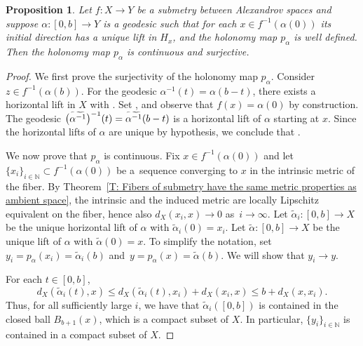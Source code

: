 \documentclass[pdftex]{sigma}
\numberwithin{equation}{section}
\newtheorem{prop}[thm]{Proposition}
\theoremstyle{definition}
\newcommand{\N}{\mathbb{N}} %
\begin{document}
\begin{prop}\label{L: holonomy maps are surjective and continuous}
Let $f\colon X\to Y$ be a submetry between Alexandrov spaces and
suppose $\alpha\colon [0,b]\to Y$ is a geodesic such that for each $x\in f^{-1}(\alpha(0))$ its initial direction has a unique lift in $H_x$, and the holonomy map $p_\alpha$ is well defined. Then the holonomy map $p_\alpha$ is continuous and surjective.
\end{prop}



\begin{proof}

We first prove the surjectivity of the holonomy map $p_\alpha$. Consider $z\in f^{-1}(\alpha(b))$. For the geodesic $\alpha^{-1}(t)= \alpha(b-t)$, there exists a horizontal lift  in $X$ with . Set , and observe that $f(x) = \alpha(0)$ by construction. The geodesic $\smash{\bigl(\widetilde{\alpha^{-1}}\bigr)^{-1}(t)} = \smash{\widetilde{\alpha^{-1}}(b-t)}$ is a horizontal lift of $\alpha$ starting at $x$. Since the horizontal lifts of $\alpha$ are unique by hypothesis, we conclude that .

We now prove that $p_\alpha$ is continuous. Fix $x\in f^{-1}(\alpha(0))$ and let $\{x_i\}_{i\in \N}\subset f^{-1}(\alpha(0))$ be a~sequence converging to $x$ in the intrinsic metric of the fiber. By Theorem~\ref{T: Fibers of submetry have the same metric properties as ambient space}, the intrinsic and the induced metric are locally Lipschitz equivalent on the fiber, hence also $d_X(x_i,x)\to 0$ as~${i\to \infty}$.
Let $\tilde{\alpha}_i\colon [0,b]\to X$ be the unique horizontal lift of $\alpha$ with $\tilde{\alpha}_i(0) = x_i$. Let $\tilde{\alpha}\colon [0,b]\to X$ be the unique lift of $\alpha$ with $\tilde{\alpha}(0) = x$. To simplify the notation, set $y_i = p_{\alpha}(x_i) = \tilde{\alpha}_i(b)$ and~${y = p_\alpha(x) = \tilde{\alpha}(b)}$. We will show that $y_i\to y$.

For each $t\in [0,b]$,
\[
d_X(\tilde{\alpha}_i(t),x)\leq d_X(\tilde{\alpha}_i(t),x_i)+d_X(x_i,x) \leq b+ d_X(x,x_i).
\]
Thus, for all sufficiently large $i$, we have that $\tilde{\alpha}_i([0,b])$ is contained in the closed ball $B_{b+1}(x)$, which is a compact subset of $X$. In particular, $\{y_i\}_{i\in\mathbb{N}}$ is contained in a compact subset of $X$.


\end{proof}
\end{document}
